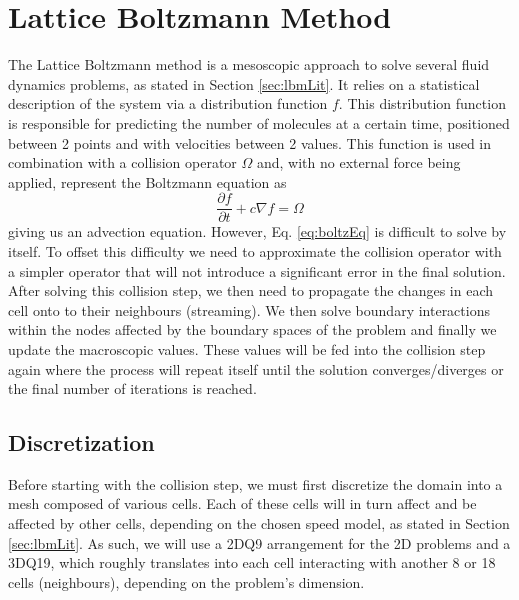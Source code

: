 \documentclass[12pt, openany]{book}
\begin{document}
\section{Lattice Boltzmann Method}
The Lattice Boltzmann method is a mesoscopic approach to solve several fluid dynamics problems, as stated in Section \ref{sec:lbmLit}. It relies on a statistical description of the system via a distribution function $f$. This distribution function is responsible for predicting the number of molecules at a certain time, positioned between 2 points and with velocities between 2 values. This function is used in combination with a collision operator $\Omega$ and, with no external force being applied, represent the Boltzmann equation as
\begin{equation}\label{eq:boltzEq}
\frac{\partial f}{\partial t} + c \nabla f = \Omega
\end{equation}
giving us an advection equation. 
However, Eq. \ref{eq:boltzEq} is difficult to solve by itself. To offset this difficulty we need to approximate the collision operator with a simpler operator that will not introduce a significant error in the final solution. After solving this collision step, we then need to propagate the changes in each cell onto to their neighbours (streaming). We then solve boundary interactions within the nodes affected by the boundary spaces of the problem and finally we update the macroscopic values. These values will be fed into the collision step again where the process will repeat itself until the solution converges/diverges or the final number of iterations is reached.
\subsection{Discretization}
Before starting with the collision step, we must first discretize the domain into a mesh composed of various cells. Each of these cells will in turn affect and be affected by other cells, depending on the chosen speed model, as stated in Section \ref{sec:lbmLit}. As such, we will use a 2DQ9 arrangement for the 2D problems and a 3DQ19, which roughly translates into each cell interacting with another 8 or 18 cells (neighbours), depending on the problem's dimension.
\end{document}
